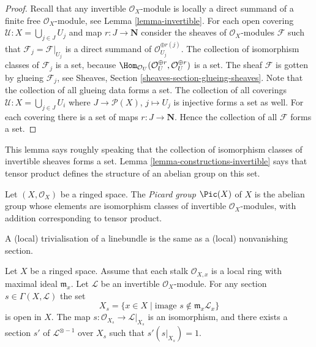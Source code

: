 \begin{proof}
Recall that any invertible $\mathcal{O}_X$-module is locally
a direct summand of a finite free $\mathcal{O}_X$-module, see
Lemma \ref{lemma-invertible}.
For each open covering $\mathcal{U} : X = \bigcup_{j \in J} U_j$
and map $r : J \to \mathbf{N}$ consider the sheaves of
$\mathcal{O}_X$-modules $\mathcal{F}$ such that
$\mathcal{F}_j = \mathcal{F}|_{U_j}$ is a direct summand of
$\mathcal{O}_{U_j}^{\oplus r(j)}$.
The collection of isomorphism classes of $\mathcal{F}_j$ is a set, because
$\Hom_{\mathcal{O}_U}(\mathcal{O}_U^{\oplus r}, \mathcal{O}_U^{\oplus r})$
is a set. The sheaf $\mathcal{F}$ is gotten by glueing $\mathcal{F}_j$,
see Sheaves, Section
\ref{sheaves-section-glueing-sheaves}. Note that the collection of
all glueing data forms a set. The collection of all coverings
$\mathcal{U} : X = \bigcup_{j \in J} U_i$ where $J \to \mathcal{P}(X)$,
$j \mapsto U_j$ is injective forms a set as well. For each covering
there is a set of maps $r : J \to \mathbf{N}$. Hence the collection
of all $\mathcal{F}$ forms a set.
\end{proof}

\noindent
This lemma says roughly speaking that the collection of
isomorphism classes of invertible sheaves forms a set.
Lemma \ref{lemma-constructions-invertible} says that
tensor product defines the structure of an abelian group
on this set.

\begin{definition}
\label{definition-pic}
Let $(X, \mathcal{O}_X)$ be a ringed space.
The {\it Picard group} $\Pic(X)$ of $X$ is the
abelian group whose elements are isomorphism classes of
invertible $\mathcal{O}_X$-modules, with addition
corresponding to tensor product.
\end{definition}

\begin{lemma}
\label{lemma-s-open}
\begin{slogan}
A (local) trivialisation of a linebundle
is the same as a (local) nonvanishing section.
\end{slogan}
Let $X$ be a ringed space. Assume that each stalk $\mathcal{O}_{X, x}$
is a local ring with maximal ideal $\mathfrak m_x$.
Let $\mathcal{L}$ be an invertible $\mathcal{O}_X$-module.
For any section $s \in \Gamma(X, \mathcal{L})$ the set
$$
X_s = \{x \in X \mid \text{image }s \not\in \mathfrak m_x\mathcal{L}_x\}
$$
is open in $X$. The map $s : \mathcal{O}_{X_s} \to \mathcal{L}|_{X_s}$
is an isomorphism, and there exists a section $s'$
of $\mathcal{L}^{\otimes -1}$ over $X_s$ such that $s' (s|_{X_s}) = 1$.
\end{lemma}

